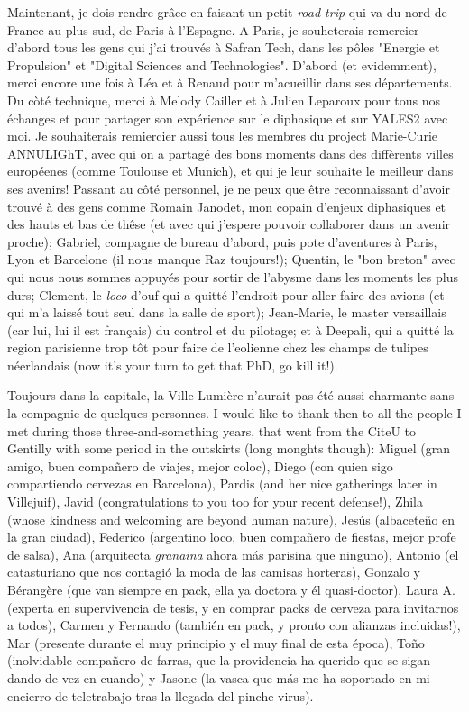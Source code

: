 Maintenant, je dois rendre grâce en faisant un petit \textsl{road trip} qui va du nord de France au plus sud, de Paris à l'Espagne. A Paris, je souheterais remercier d'abord tous les gens qui j'ai trouvés à Safran Tech, dans les pôles "Energie et Propulsion" et "Digital Sciences and Technologies". D'abord (et evidemment), merci encore une fois à Léa et à Renaud pour m'acueillir dans ses départements. Du còté technique, merci à Melody Cailler et à Julien Leparoux pour tous nos échanges et pour partager son expérience sur le diphasique et sur YALES2 avec moi. Je souhaiterais remiercier aussi tous les membres du project Marie-Curie ANNULIGhT, avec qui on a partagé des bons moments dans des diffèrents villes européenes (comme Toulouse et Munich), et qui je leur souhaite le meilleur dans ses avenirs! Passant au côté personnel, je ne peux que être reconnaissant d'avoir trouvé à des gens comme Romain Janodet, mon copain d'enjeux diphasiques et des hauts et bas de thêse (et avec qui j'espere pouvoir collaborer dans un avenir proche); Gabriel, compagne de bureau d'abord, puis pote d'aventures à Paris, Lyon et Barcelone (il nous manque Raz toujours!); Quentin, le "bon breton" avec qui nous nous sommes appuyés pour sortir de l'abysme dans les moments les plus durs; Clement, le \textsl{loco} d'ouf qui a quitté l'endroit pour aller faire des avions (et qui m'a laissé tout seul dans la salle de sport); Jean-Marie, le master versaillais (car lui, lui il est français) du control et du pilotage; et à Deepali, qui a quitté la region parisienne trop tôt pour faire de l'eolienne chez les champs de tulipes néerlandais (now it's your turn to get that PhD, go kill it!).
  
Toujours dans la capitale, la Ville Lumière n'aurait pas été aussi charmante sans la compagnie de quelques personnes. I would like to thank then to all the people I met during those three-and-something years, that went from the CiteU to Gentilly with some period in the outskirts (long monghts though): Miguel (gran amigo, buen compañero de viajes, mejor coloc), Diego (con quien sigo compartiendo cervezas en Barcelona), Pardis (and her nice gatherings later in Villejuif), Javid (congratulations to you too for your recent defense!), Zhila (whose kindness and welcoming are beyond human nature), Jesús (albaceteño en la gran ciudad), Federico (argentino loco, buen compañero de fiestas, mejor profe de salsa), Ana (arquitecta \textsl{granaina} ahora más parisina que ninguno), Antonio (el catasturiano que nos contagió la moda de las camisas horteras), Gonzalo y Bérangère (que van siempre en pack, ella ya doctora y él quasi-doctor), Laura A. (experta en supervivencia de tesis, y en comprar packs de cerveza para invitarnos a todos), Carmen y Fernando (también en pack, y pronto con alianzas incluidas!), Mar (presente durante el muy principio y el muy final de esta época), Toño (inolvidable compañero de farras, que la providencia ha querido que se sigan dando de vez en cuando) y Jasone (la vasca que más me ha soportado en mi encierro de teletrabajo tras la llegada del pinche virus).

